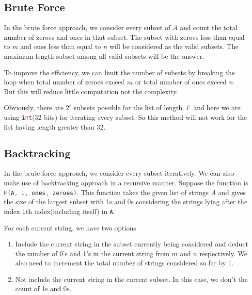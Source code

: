 \subsection{Brute Force}
In the brute force approach, we consider every subset of $A$ and count the total number of zeroes and ones in that subset. The subset with zeroes less than equal to $m$ and ones less than equal to $n$ will be considered as the valid subsets. The maximum length subset among all valid subsets will be the answer.

To improve the efficiency, we can limit the number of subsets by breaking the loop when total number of zeroes exceed $m$ or total number of ones exceed $n$. But this will reduce little computation not the complexity.

Obviously, there are $2^{\ell}$ subsets possible for the list of length $\ell$ and here we are using \lstinline[language=C++, basicstyle=\small\ttfamily, keywordstyle=\bfseries\color{green!40!black}]|int|(32 bits) for iterating every subset. So this method will not work for the list having length greater than 32.


\subsection{Backtracking}
In the brute force approach, we consider every subset iteratively. We can also make use of backtracking approach in a recursive manner. Suppose the function is \lstinline[language=C++, basicstyle=\small\ttfamily, keywordstyle=\bfseries\color{green!40!black}]|F(A, i, ones, zeroes)|. This function takes the given list of strings $A$ and gives the size of the largest subset with 1s and 0s considering the strings lying after the index \lstinline[language=C++, basicstyle=\small\ttfamily, keywordstyle=\bfseries\color{green!40!black}]|i|th index(including itself) in \lstinline[language=C++, basicstyle=\small\ttfamily, keywordstyle=\bfseries\color{green!40!black}]|A|.

For each current string, we have two options

\begin{enumerate}
\item Include the current string in the subset currently being considered and deduct the number of 0's and 1's in the current string from $m$ and $n$ respectively. We also need to increment the total number of strings considered so far by 1. 
\item Not include the current string in the current subset. In this case, we don't the count of 1s and 0s. 
\end{enumerate}

